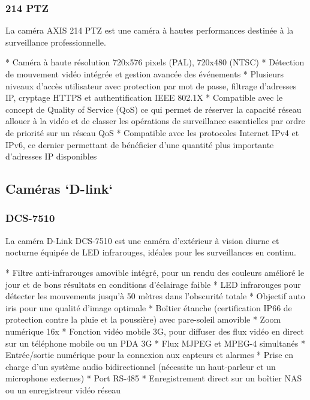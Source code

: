    	\subsubsection{214 PTZ}
La caméra AXIS 214 PTZ est une caméra à hautes performances destinée à la
surveillance professionnelle.

	* Caméra à haute résolution 720x576 pixels (PAL), 720x480 (NTSC)
	* Détection de mouvement vidéo intégrée et gestion avancée des événements
	* Plusieurs niveaux d’accès utilisateur avec protection par mot de passe,
 	filtrage d’adresses IP, cryptage HTTPS et authentification IEEE 802.1X 
 	* Compatible avec le concept de Quality of Service (QoS) ce qui permet de
 	réserver la capacité réseau allouer à la vidéo et de classer les opérations de
 	surveillance essentielles par ordre de priorité sur un réseau QoS
 	* Compatible avec les protocoles Internet IPv4 et IPv6, ce dernier permettant
 	de bénéficier d’une quantité plus importante d’adresses IP disponibles

\subsection{Caméras `D-link`}
	\subsubsection{DCS-7510}
La caméra D-Link DCS-7510 est 	une caméra d'extérieur à vision diurne et
nocturne équipée de LED infrarouges, idéales pour les surveillances en continu.

	* Filtre anti-infrarouges amovible intégré, pour un rendu des couleurs amélioré
	le jour et de bons résultats en conditions d'éclairage faible 
	* LED infrarouges
	pour détecter les mouvements jusqu'à 50 mètres dans l'obscurité totale 
	* Objectif auto iris pour une qualité d’image optimale 
	* Boîtier étanche (certification IP66 de protection contre la pluie et la
	poussière) avec pare-soleil amovible 
	* Zoom numérique 16x 
	* Fonction vidéo mobile 3G, pour diffuser des flux vidéo en direct sur un
	téléphone mobile ou un PDA 3G 
	* Flux MJPEG et MPEG-4 simultanés 
	* Entrée/sortie numérique pour la connexion aux capteurs et alarmes 
	* Prise en charge d'un système audio bidirectionnel (nécessite un haut-parleur
	et un microphone externes) 
	* Port RS-485
	* Enregistrement direct sur un boîtier NAS ou un enregistreur vidéo réseau
		
